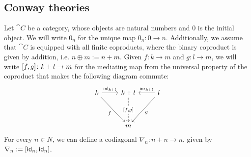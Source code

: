\subsection{Conway theories}\label{c3:subsec:conway}
Let $\cat{C}$ be a category, whose objects are natural numbers and $0$ is the initial object. We will write $0_n$ for the unique map $0_n \colon 0 \to n$. Additionally, we assume that $\cat{C}$ is equipped with all finite coproducts, where the binary coproduct is given by addition, i.e. $n \oplus m := n + m$. Given $f \colon k \to m$ and $g \colon l \to m$, we will write $[ f,g ] \colon k +l \to m$ for the mediating map from the universal property of the coproduct that makes the following diagram commute:
\begin{equation}\label{eqn:mediating}
\begin{tikzcd}
	k & {k+l} & l \\
	\\
	& m
	\arrow["{\inl_{k + l}}", from=1-1, to=1-2]
	\arrow["f"', from=1-1, to=3-2]
	\arrow["{[f,g]}"{description}, dashed, from=1-2, to=3-2]
	\arrow["{\inr_{k + l}}"', from=1-3, to=1-2]
	\arrow["g", from=1-3, to=3-2]
\end{tikzcd}
\end{equation}
For every $n \in N$, we can define a codiagonal $\nabla_{n} \colon n + n \to n$, given by $\nabla_n := [\mathsf{id}_n,\mathsf{id}_n]$.

